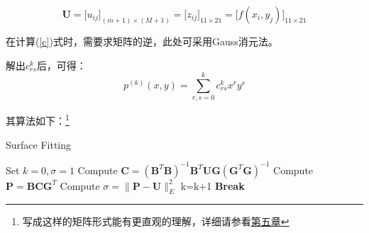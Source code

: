 \[\bm{U} =
\big[u_{ij}\big]_{(m+1)\times (M+1)}=
\big[z_{ij}\big]_{11\times 21}=
\big[f(x_i,y_j)\big]_{11\times 21}
\]

在计算(\ref{c})式时，需要求矩阵的逆，此处可采用Gauss消元法。

解出$c_{rs}^{k}$后，可得：
\[p^{(k)}(x,y) = \sum\limits_{r,s = 0}^k {{c_{rs}^{k}}{x^r}{y^s}} \]



其算法如下：\footnote{写成这样的矩阵形式能有更直观的理解，详细请参看\hyperref[sec:discuss]{第五章}}

\begin{algorithm}[h]  
\caption{Surface Fitting }  
\begin{algorithmic}[1]  
\STATE Set $k=0,\sigma=1$
\WHILE {$\sigma >\varepsilon$}
\STATE Compute $\bm{C}=(\bm{B}^T\bm{B})^{-1}\bm{B}^T\bm{U}\bm{G}(\bm{G}^T\bm{G})^{-1}$ 
\STATE Compute $\bm{P}=\bm{B}\bm{C}\bm{G}^T$ 
\STATE Compute $\sigma={\|{\bm{P}-\bm{U}}\|_{E}^2}$
\STATE k=k+1
\STATE \textbf{Break}
\ENDIF 
\ENDWHILE
\end{algorithmic}  
\end{algorithm}  

\newpage



